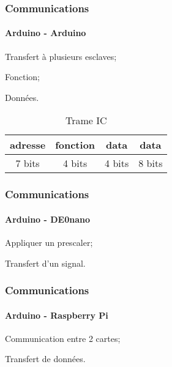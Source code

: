 \begin{frame}
\frametitle{Communications}
\framesubtitle{Arduino - Arduino}

\begin{description}
\item[IC]
\item Transfert à plusieurs esclaves;
\item Fonction;
\item Données.
\end{description}

\begin{table}[!ht]
	\centering
	\begin{tabular}{|c|c|c|c|}
		\hline
		adresse & fonction & data & data \\
		\hline
		7 bits & 4 bits & 4 bits & 8 bits \\
		\hline
	\end{tabular}
	\caption{Trame IC}
	\label{tb:TrameI2C}
\end{table}
\end{frame}

\begin{frame}
\frametitle{Communications}
\framesubtitle{Arduino - DE0nano}
\begin{description}
\item[Direct]
\item Appliquer un prescaler;
\item Transfert d'un signal.
\end{description}
\end{frame}

\begin{frame}
\frametitle{Communications}
\framesubtitle{Arduino - Raspberry Pi}
\begin{description}
\item[SPI/UART]
\item Communication entre 2 cartes;
\item Transfert de données.
\end{description}
\end{frame}
